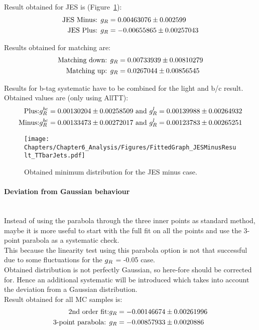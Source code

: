 Result obtained for JES is (Figure~\ref{fig::MinJESMinus}):
\begin{eqnarray}
 \textrm{JES Minus: } & g_{R} = 0.00463076 \pm 0.002599 \\
 \textrm{JES Plus: }  & g_{R} = -0.00655865 \pm 0.00257043
\end{eqnarray}

Results obtained for matching are:
\begin{eqnarray}
 \textrm{Matching down: } & g_{R} = 0.00733939 \pm 0.00810279 \\
 \textrm{Matching up: }   & g_{R} = 0.0267044 \pm 0.00856545
\end{eqnarray}

Results for b-tag systematic have to be combined for the light and b/c result.
Obtained values are (only using AllTT):
\begin{eqnarray}
 \textrm{Plus:} & g_{R}^{bc} = 0.00130204 \pm 0.00258509 \textrm{ and } g_{R}^{l} = 0.00139988 \pm 0.00264932 \\
 \textrm{Minus:} & g_{R}^{bc} = 0.00133473 \pm 0.00272017 \textrm{ and } g_{R}^{l} = 0.00123783 \pm 0.00265251
\end{eqnarray}


\begin{figure}[h!t]
 \centering
 \texttt{[image: Chapters/Chapter6\_Analysis/Figures/FittedGraph\_JESMinusResult\_TTbarJets.pdf]}
 \caption{Obtained minimum distribution for the JES minus case.} \label{fig::MinJESMinus}
\end{figure}

\paragraph{Deviation from Gaussian behaviour} \hfill \\
Instead of using the parabola through the three inner points as standard method, maybe it is more useful to start with the full fit on all the points and use the 3-point parabola as a systematic check.
\\
This because the linearity test using this parabola option is not that successful due to some fluctuations for the $g_{R}$ = -0.05 case.
\\

Obtained distribution is not perfectly Gaussian, so here-fore should be corrected for.
Hence an additional systematic will be introduced which takes into account the deviation from a Gaussian distribution.
\\
Result obtained for all MC samples is:
\begin{eqnarray}
 \textrm{2nd order fit:}     & g_{R} = -0.00146674 \pm 0.00261996\\
 \textrm{3-point parabola: } & g_{R} = -0.00857933 \pm 0.0020886
\end{eqnarray}

